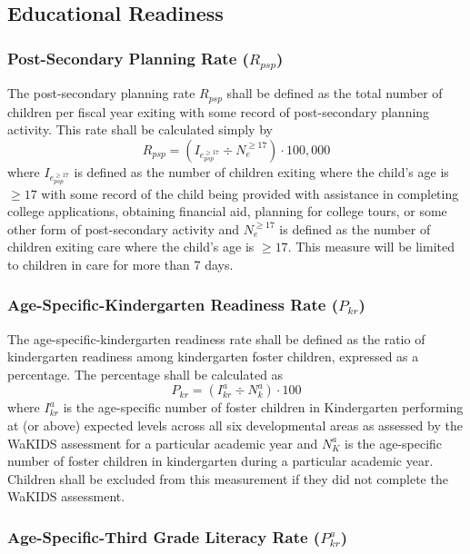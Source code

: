 \documentclass[12pt]{article}\usepackage[]{graphicx}\usepackage[]{color}
\begin{document}
\subsection{Educational Readiness}

\subsubsection{Post-Secondary Planning Rate ($R_{psp}$)}

The post-secondary planning rate $R_{psp}$ shall be defined as the total number of children per fiscal year exiting with some record of post-secondary planning activity. This rate shall be calculated simply by 
\begin{equation}\label{eq:Rpsp}
R_{psp} = (I_{e_{psp}^{\geq17}} \div N_e^{\geq17}) \cdot 100,000
\end{equation}
where $I_{e_{psp}^{\geq17}}$ is defined as the number of children exiting where the child's age is $\geq17$ with some record of the child being provided with assistance in completing college applications, obtaining financial aid, planning for college tours, or some other form of post-secondary activity and $N_e^{\geq17}$ is defined as the number of children exiting care where the child's age is $\geq17$. This measure will be limited to children in care for more than 7 days.

\subsubsection{Age-Specific-Kindergarten Readiness Rate ($P_{kr}$)}

The age-specific-kindergarten readiness rate shall be defined as the ratio of kindergarten readiness among kindergarten foster children, expressed as a percentage. The percentage shall be calculated as 
$$
P_{kr}= (I_{kr}^a \div N_k^a) \cdot 100
$$
where ${}I_{kr}^a$ is the age-specific number of foster children in Kindergarten performing at (or above) expected levels across all six developmental areas as assessed by the WaKIDS assessment for a particular academic year and $N_K^a$ is the age-specific number of foster children in kindergarten during a particular academic year. Children shall be excluded from this measurement if they did not complete the WaKIDS assessment. 

\subsubsection{Age-Specific-Third Grade Literacy Rate ($P_{kr}^a$)}
\end{document}
